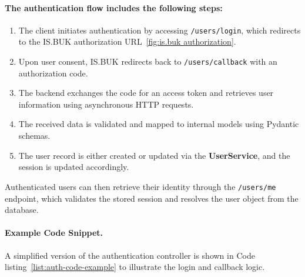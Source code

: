 \paragraph{The authentication flow includes the following steps:}
\begin{enumerate}
  \item The client initiates authentication by accessing \texttt{/users/login}, which redirects to the IS.BUK authorization URL~\ref{fig:is.buk authorization}.
  \item Upon user consent, IS.BUK redirects back to \texttt{/users/callback} with an authorization code.
  \item The backend exchanges the code for an access token and retrieves user information using asynchronous HTTP requests.
  \item The received data is validated and mapped to internal models using Pydantic schemas.
  \item The user record is either created or updated via the \textbf{UserService}, and the session is updated accordingly.
\end{enumerate}

Authenticated users can then retrieve their identity through the \texttt{/users/me} endpoint, which validates the stored session and resolves the user object from the database.

\paragraph{Example Code Snippet.}
A simplified version of the authentication controller is shown in Code listing~\ref{list:auth-code-example} to illustrate the login and callback logic.

